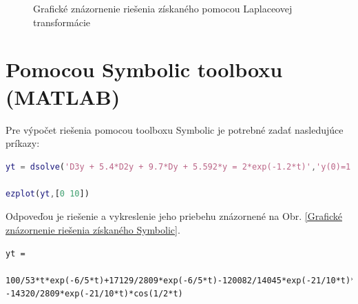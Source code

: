 \documentclass[a4paper, 10pt, ]{article}
\begin{document}
\begin{figure}[!ht]
	\centering


	\caption{Grafické znázornenie riešenia získaného pomocou Laplaceovej transformácie}
	\label{Grafické znázornenie riešenia získaného pomocou Laplaceovej transformácie}
\end{figure}














\section{Pomocou Symbolic toolboxu (MATLAB)}



Pre výpočet riešenia pomocou toolboxu Symbolic je potrebné zadať nasledujúce príkazy:
\begin{lstlisting}[language=Matlab,]
yt = dsolve('D3y + 5.4*D2y + 9.7*Dy + 5.592*y = 2*exp(-1.2*t)','y(0)=1','Dy(0)=1','D2y(0)=1')

ezplot(yt,[0 10])
\end{lstlisting}
Odpoveďou je riešenie a vykreslenie jeho priebehu znázornené na Obr. \ref{Grafické znázornenie riešenia získaného Symbolic}.
{\footnotesize
\begin{verbatim}
yt =

100/53*t*exp(-6/5*t)+17129/2809*exp(-6/5*t)-120082/14045*exp(-21/10*t)*sin(1/2*t)
-14320/2809*exp(-21/10*t)*cos(1/2*t)
\end{verbatim}}
\end{document}
